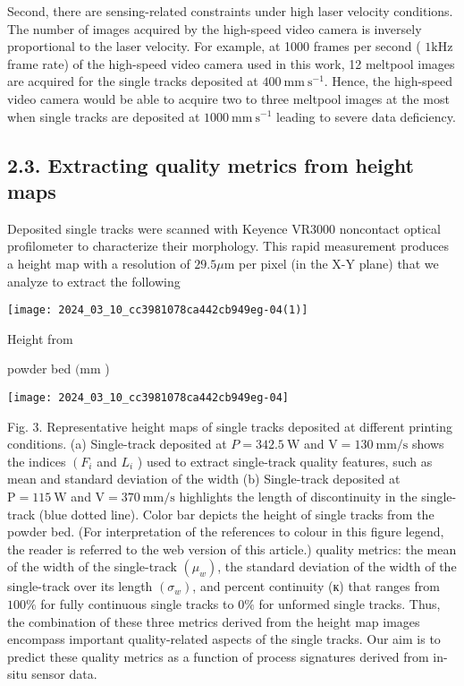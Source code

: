 \documentclass[10pt]{article}
\begin{document}
Second, there are sensing-related constraints under high laser velocity conditions. The number of images acquired by the high-speed video camera is inversely proportional to the laser velocity. For example, at 1000 frames per second ( $1 \mathrm{kHz}$ frame rate) of the high-speed video camera used in this work, 12 meltpool images are acquired for the single tracks deposited at $400 \mathrm{~mm} \mathrm{~s}^{-1}$. Hence, the high-speed video camera would be able to acquire two to three meltpool images at the most when single tracks are deposited at $1000 \mathrm{~mm} \mathrm{~s}^{-1}$ leading to severe data deficiency.

\subsection*{2.3. Extracting quality metrics from height maps}
Deposited single tracks were scanned with Keyence VR3000 noncontact optical profilometer to characterize their morphology. This rapid measurement produces a height map with a resolution of $29.5 \mu \mathrm{m}$ per pixel (in the X-Y plane) that we analyze to extract the following

\begin{center}
\texttt{[image: 2024\_03\_10\_cc3981078ca442cb949eg-04(1)]}
\end{center}

Height from

powder bed $(\mathrm{mm}$ )

\begin{center}
\texttt{[image: 2024\_03\_10\_cc3981078ca442cb949eg-04]}
\end{center}

Fig. 3. Representative height maps of single tracks deposited at different printing conditions. (a) Single-track deposited at $P=342.5 \mathrm{~W}$ and $\mathrm{V}=130 \mathrm{~mm} / \mathrm{s}$ shows the indices $\left(F_{i}\right.$ and $L_{i}$ ) used to extract single-track quality features, such as mean and standard deviation of the width (b) Single-track deposited at $\mathrm{P}=115 \mathrm{~W}$ and $\mathrm{V}=370 \mathrm{~mm} / \mathrm{s}$ highlights the length of discontinuity in the single-track (blue dotted line). Color bar depicts the height of single tracks from the powder bed. (For interpretation of the references to colour in this figure legend, the reader is referred to the web version of this article.) quality metrics: the mean of the width of the single-track $\left(\mu_{w}\right)$, the standard deviation of the width of the single-track over its length $\left(\sigma_{w}\right)$, and percent continuity (к) that ranges from $100 \%$ for fully continuous single tracks to $0 \%$ for unformed single tracks. Thus, the combination of these three metrics derived from the height map images encompass important quality-related aspects of the single tracks. Our aim is to predict these quality metrics as a function of process signatures derived from in-situ sensor data.
\end{document}

